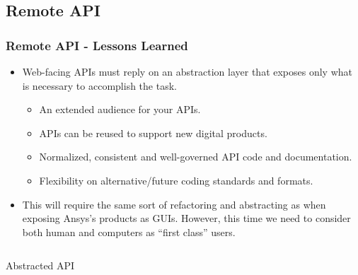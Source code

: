 \documentclass[t]{beamer}
\begin{document}
\subsection{Remote API}
\begin{frame}[fragile=singleslide]
  \frametitle{Remote API - Lessons Learned}
  \vspace{-10pt}

  \begin{itemize}
  \item Web-facing APIs must reply on an abstraction layer that exposes only what is necessary to accomplish the task.
    \begin{itemize}
    \item An extended audience for your APIs.
    \item APIs can be reused to support new digital products.
    \item Normalized, consistent and well-governed API code and documentation.
    \item Flexibility on alternative/future coding standards and formats.
    \end{itemize}
  \item This will require the same sort of refactoring and abstracting as when
    exposing Ansys's products as GUIs. However, this time we need to consider
    both human and computers as ``first class'' users.
  \end{itemize}

  \vspace{-15pt}
  \pyramidthree{}

  \vspace{-5pt}
  \begin{columns}[T]
    \begin{column}{.6\textwidth}
      \begin{exampleblock}{\small Abstracted API}
        \inputminted[fontsize=\scriptsize]{python}{code/sample_apis.py}
      \end{exampleblock}
    \end{column}
    \begin{column}{.2\textwidth}
    \end{column}
  \end{columns}

\end{frame}
\end{document}
